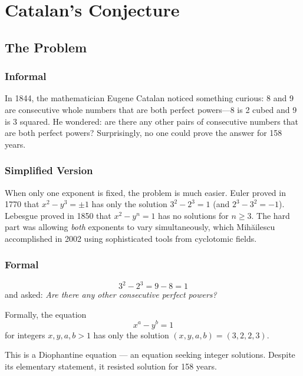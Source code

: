 \let\LocalMacro\relax

\chapter{Catalan's Conjecture}

\section{The Problem}

\subsection{Informal}
In 1844, the mathematician Eugene Catalan noticed something curious: 8 and 9 are consecutive whole numbers that are both perfect powers---8 is 2 cubed and 9 is 3 squared. He wondered: are there any other pairs of consecutive numbers that are both perfect powers? Surprisingly, no one could prove the answer for 158 years.

\subsection{Simplified Version}
When only one exponent is fixed, the problem is much easier. Euler proved in 1770 that $x^2 - y^3 = \pm 1$ has only the solution $3^2 - 2^3 = 1$ (and $2^3 - 3^2 = -1$). Lebesgue proved in 1850 that $x^2 - y^n = 1$ has no solutions for $n \ge 3$. The hard part was allowing \emph{both} exponents to vary simultaneously, which Mihăilescu accomplished in 2002 using sophisticated tools from cyclotomic fields.

\subsection{Formal}
\begin{equation}
3^2 - 2^3 = 9 - 8 = 1
\end{equation}
and asked: \emph{Are there any other consecutive perfect powers?}

Formally, the equation
\begin{equation}
x^a - y^b = 1
\end{equation}
for integers $x, y, a, b > 1$ has only the solution $(x, y, a, b) = (3, 2, 2, 3)$.

This is a Diophantine equation — an equation seeking integer solutions. Despite its elementary statement, it resisted solution for 158 years.

